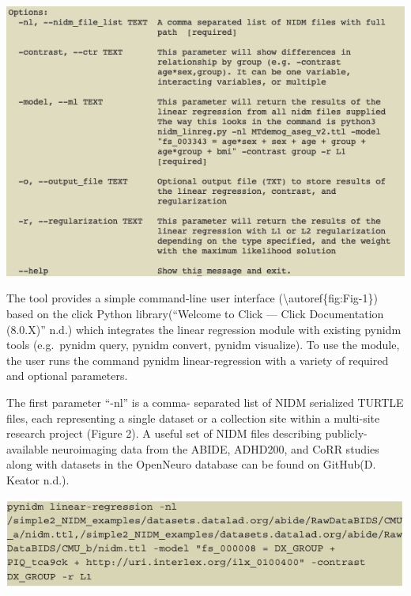 \includegraphics{fig-1.png}

The tool provides a simple command-line user interface
(\textbackslash{}autoref\{fig:Fig-1\}) based on the click Python
library(``Welcome to Click --- Click Documentation (8.0.X)'' n.d.) which
integrates the linear regression module with existing pynidm tools
(e.g.~pynidm query, pynidm convert, pynidm visualize). To use the
module, the user runs the command pynidm linear-regression with a
variety of required and optional parameters.

The first parameter ``-nl'' is a comma- separated list of NIDM
serialized TURTLE files, each representing a single dataset or a
collection site within a multi-site research project (Figure 2). A
useful set of NIDM files describing publicly-available neuroimaging data
from the ABIDE, ADHD200, and CoRR studies along with datasets in the
OpenNeuro database can be found on GitHub(D. Keator n.d.).

\includegraphics{fig-2.png}

